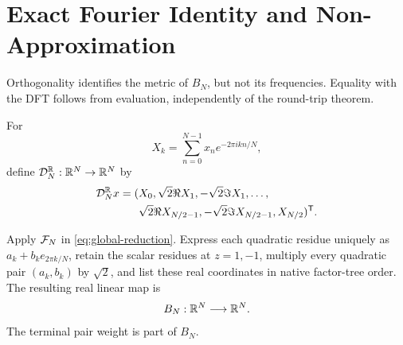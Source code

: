 \section{Exact Fourier Identity and Non-Approximation}
\label{sec:fourier-identity}

Orthogonality identifies the metric of $B_N$, but not its frequencies.  Equality
with the DFT follows from evaluation, independently of the round-trip theorem.

\begin{definition}
For
\begin{equation}
 X_k=\sum_{n=0}^{N-1}x_n e^{-2\pi i kn/N},
 \label{eq:dft-definition}
\end{equation}
define $\mathcal{D}_N^{\mathbb{R}}:\mathbb{R}^N\to\mathbb{R}^N$ by
\begin{equation}
\begin{aligned}
 \mathcal{D}_N^{\mathbb{R}}x=(&X_0,\sqrt2\Re X_1,-\sqrt2\Im X_1,\ldots,\\
 &\sqrt2\Re X_{N/2-1},-\sqrt2\Im X_{N/2-1},X_{N/2})^{\mathsf{T}}.
\end{aligned}
 \label{eq:packed-dft}
\end{equation}
\end{definition}

\begin{definition}
Apply $\mathcal{F}_N$ in \eqref{eq:global-reduction}.  Express each quadratic residue
uniquely as $a_k+b_ke_{2\pi k/N}$, retain the scalar residues at $z=1,-1$,
multiply every quadratic pair $(a_k,b_k)$ by $\sqrt2$, and list these real
coordinates in native factor-tree order.  The resulting real linear map is
\begin{equation}
 B_N:\mathbb{R}^N\longrightarrow\mathbb{R}^N.
 \label{eq:BN-definition}
\end{equation}
The terminal pair weight is part of $B_N$.
\end{definition}

